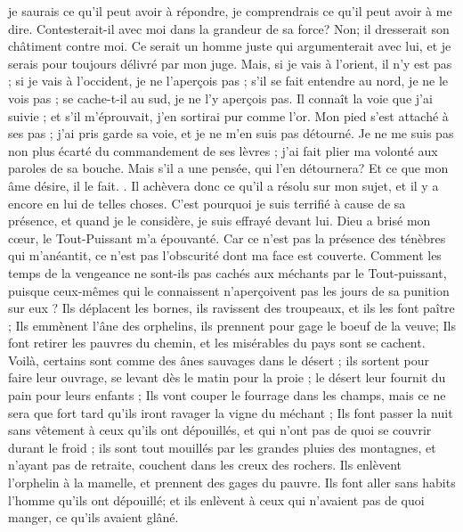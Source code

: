 \begin{multicols}{2}
{je saurais ce qu'il peut avoir à répondre, je comprendrais ce qu'il peut avoir à me dire.
Contesterait-il avec moi dans la grandeur de sa force? Non; il dresserait  son châtiment contre moi. 
Ce serait un homme juste qui argumenterait avec lui, et je serais pour toujours délivré par mon juge.
Mais, si je vais à l'orient, il n'y est pas ; si je vais à l'occident, je ne l'aperçois pas ;
s'il se fait entendre au nord, je ne le vois pas ; se cache-t-il au sud, je ne l'y aperçois pas.
Il connaît la voie que j'ai suivie ; et s'il m'éprouvait, j'en sortirai pur comme l'or.
Mon pied s'est attaché à ses pas ; j'ai pris garde sa voie, et je ne m'en suis pas détourné.
Je ne me suis pas non plus écarté du commandement de ses lèvres ; j'ai fait plier ma volonté aux paroles de sa bouche.
Mais s'il a une pensée, qui l'en détournera? Et ce que mon âme désire, il le fait.
.
Il achèvera donc ce qu'il a résolu sur mon sujet, et il y a encore en lui de telles choses.
C'est pourquoi je suis terrifié à cause de sa présence, et quand je le considère, je suis effrayé devant lui.
Dieu a brisé mon cœur, le Tout-Puissant m'a épouvanté.
Car ce n'est pas la présence des ténèbres qui m'anéantit, ce n'est pas l'obscurité dont ma face est couverte.
\VerseOne{}Comment les temps de la vengeance ne sont-ils pas cachés aux méchants par le Tout-puissant, puisque ceux-mêmes qui le connaissent n'aperçoivent pas les jours de sa punition sur eux ?
Ils déplacent les bornes, ils ravissent des troupeaux, et ils les font paître ;
Ils emmènent l'âne des orphelins, ils prennent pour gage le boeuf de la veuve;
Ils font retirer les pauvres du chemin, et les misérables du pays sont se cachent.
Voilà, certains sont comme des ânes sauvages dans le désert ; ils sortent pour faire leur ouvrage, se levant dès le matin pour la proie ; le désert leur fournit du pain pour leurs enfants ;
Ils vont couper le fourrage dans les champs, mais ce ne sera que fort tard qu'ils iront ravager la vigne du méchant ; 
Ils font passer la nuit sans vêtement à ceux qu'ils ont dépouillés, et qui n'ont pas de quoi se couvrir durant le froid  ;
ils sont tout mouillés par les grandes pluies des montagnes, et n'ayant pas de retraite, couchent dans les creux des rochers. 
Ils enlèvent l'orphelin à la mamelle, et prennent des gages du pauvre. 
Ils font aller sans habits l'homme qu'ils ont dépouillé; et ils enlèvent à ceux qui n'avaient pas de quoi manger, ce qu'ils avaient glâné.
}
\end{multicols}
